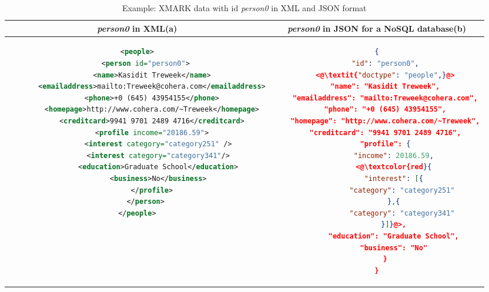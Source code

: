 \begin{longtable}{c|c}
	\caption{Example: XMARK data with id \textit{person0} in XML and JSON format }
	\label{tbl:xmark-xml-json}\\
	{\textit{person0}} in XML(a) & {\textit{person0}} in JSON for a NoSQL database(b)\\
	\hline
	\begin{minipage}{.4\textwidth}
\centering		
\begin{lstlisting}[language=XML,basicstyle = \tiny,label=code:xml-nosql-person0]
<people>
    <person id="person0">
       <name>Kasidit Treweek</name>
       <emailaddress>mailto:Treweek@cohera.com</emailaddress>
       <phone>+0 (645) 43954155</phone>
       <homepage>http://www.cohera.com/~Treweek</homepage>
       <creditcard>9941 9701 2489 4716</creditcard>
       <profile income="20186.59">
          <interest category="category251" />
          <interest category="category341"/>
          <education>Graduate School</education>
          <business>No</business>
       </profile>
    </person>
</people>
\end{lstlisting}	
	\end{minipage} &
	\begin{minipage}{.55\textwidth}
		\centering
		\begin{lstlisting}[language=JSON, basicstyle =\tiny, label=code:json-nosql-person0, numberstyle=\tiny]
{
	"id": "person0",
	<@\textit{"doctype": "people",}@>
	"name": "Kasidit Treweek",
	"emailaddress": "mailto:Treweek@cohera.com",
	"phone": "+0 (645) 43954155",
	"homepage": "http://www.cohera.com/~Treweek",
	"creditcard": "9941 9701 2489 4716",
	"profile": {
		"income": 20186.59,
		<@\textcolor{red}{
		"interest": [{
			"category": "category251"
		},{
			"category": "category341"
		}]}@>,
		"education": "Graduate School",
		"business": "No"
	}
}
		\end{lstlisting}
	\end{minipage}\\
\end{longtable}



\begin{comment}
\iffalse\fi
\begin{minipage}{.5\textwidth}
	\begin{tikzpicture}[%
	grow via three points={one child at (0.5,-0.7) and
		two children at (0.5,-0.7) and (0.5,-1.4)},
	edge from parent path={(\tikzparentnode.south) |- (\tikzchildnode.west)}]
	\node {\{asfdasfd\}}
	child { node [defi] {\textit{Schema\_ID}}}
	child { node [json] {xs:attribute}
		child { node [defi] {\textit{Attribute\_ID}}}
		child { node [attribute] {@name}}
		child { node [attribute] {@type}}
		child { node [attribute] {@fixed}}
		child { node [attribute] {@default}}
	};
	\end{tikzpicture}
\end{minipage}

\end{comment}

